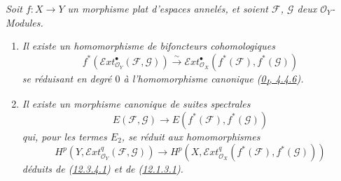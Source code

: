 \begin{proposition}[12.3.4]
\label{0.12.3.4-fr}
\emph{Soit $f:X\to Y$ un morphisme plat d'espaces annelés, et soient
$\mathcal F$, $\mathcal G$ deux $\mathcal O_Y$-Modules.}
\begin{enumerate}
\item[{\rm(i)}] \emph{Il existe un homomorphisme de bifoncteurs
cohomologiques
\[
\label{0.12.3.4.1-fr}
\tag{12.3.4.1}
f^*(\mathcal{E}xt_{\mathcal O_Y}^{\bullet}(\mathcal F,\mathcal G))
\xrightarrow{\sim}
\mathcal{E}xt_{\mathcal O_X}^{\bullet}(f^*(\mathcal F),f^*(\mathcal G))
\]
se réduisant en degré $0$ à l'homomorphisme canonique
(\hyperref[0.4.4.6-fr]{0\textsubscript{I}, 4.4.6}).}

\item[{\rm(ii)}] \emph{Il existe un morphisme canonique de suites spectrales
\[
\label{0.12.3.4.2-fr}
\tag{12.3.4.2}
E(\mathcal F,\mathcal G)\longrightarrow
E(f^*(\mathcal F),f^*(\mathcal G))
\]
qui, pour les termes $E_2$, se réduit aux homomorphismes
\[
\label{0.12.3.4.3-fr}
\tag{12.3.4.3}
H^p(Y,\mathcal{E}xt_{\mathcal O_Y}^q(\mathcal F,\mathcal G))
\longrightarrow
H^p(X,\mathcal{E}xt_{\mathcal O_X}^q(f^*(\mathcal F),f^*(\mathcal G)))
\]
déduits de (\hyperref[0.12.3.4.1-fr]{12.3.4.1}) et de
(\hyperref[0.12.1.3.1-fr]{12.1.3.1}).}
\end{enumerate}
\end{proposition}

